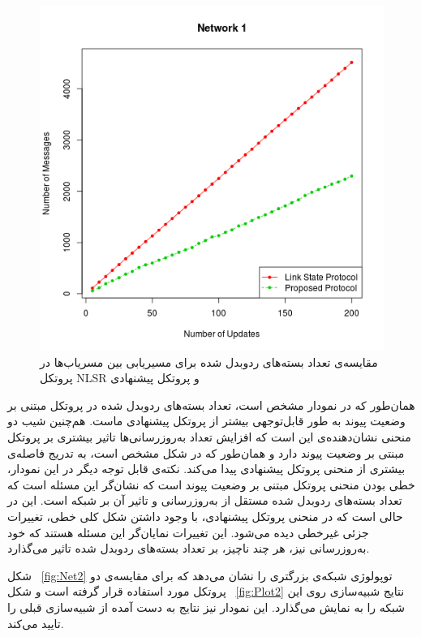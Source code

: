 \begin{figure}[h!]
\centering
\includegraphics[scale=0.8]{./resources/figures/Test1.png}
\caption{مقایسه‌ی تعداد بسته‌های ردوبدل شده برای مسیریابی بین مسریاب‌ها در پروتکل NLSR و پروتکل پیشنهادی }
\label{fig:Plot1}
\end{figure}همان‌طور که در نمودار مشخص است، تعداد بسته‌های ردوبدل شده در پروتکل مبتنی بر وضعیت پیوند به طور قابل‌توجهی بیشتر از پروتکل پیشنهادی ماست. هم‌چنین شیب دو منحنی نشان‌دهنده‌ی این است که افزایش تعداد به‌روزرسانی‌ها تاثیر بیشتری بر پروتکل مبنتی بر وضعیت پیوند دارد و همان‌طور که در شکل مشخص است، به تدریج فاصله‌ی بیشتری از منحنی پروتکل پیشنهادی پیدا می‌کند. نکته‌ی قابل توجه دیگر در این نمودار، خطی بودن منحنی پروتکل مبتنی بر وضعیت پیوند است که نشان‌گر این مسئله است که تعداد بسته‌های ردو‌بدل شده مستقل از به‌روزرسانی و تاثیر آن بر شبکه است. این در حالی است که در منحنی پروتکل پیشنهادی، با وجود داشتن شکل کلی خطی، تغییرات جزئی غیرخطی دیده می‌شود. این تغییرات نمایان‌گر این مسئله هستند که خود به‌روزرسانی نیز، هر چند ناچیز، بر تعداد بسته‌های ردوبدل شده تاثیر می‌گذارد. 

شکل ~\ref{fig:Net2} توپولوژی شبکه‌ی بزرگتری را نشان می‌دهد که برای مقایسه‌ی دو پروتکل مورد استفاده قرار گرفته است و شکل ~\ref{fig:Plot2} نتایج شبیه‌سازی روی این شبکه را به نمایش می‌گذارد. این نمودار نیز نتایج به دست آمده از شبیه‌سازی قبلی را تایید می‌کند.


